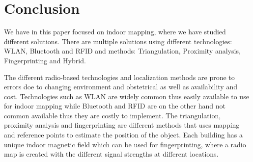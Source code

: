 \section{Conclusion}
We have in this paper focused on indoor mapping, where we have studied different solutions.
There are multiple solutions using different technologies: WLAN, Bluetooth and RFID and methods: Triangulation, Proximity analysis, Fingerprinting and Hybrid.

The different radio-based technologies and localization methods are prone to errors doe to changing environment and obstetrical as well as availability and cost.
Technologies such as WLAN are widely common thus easily available to use for indoor mapping while Bluetooth and RFID are on the other hand not common available thus they are costly to implement.
The triangulation, proximity analysis and fingerprinting are different methods that uses mapping and reference points to estimate the position of the object.
Each building has a unique indoor magnetic field which can be used for fingerprinting, where a radio map is created with the different signal strengths at different locations.